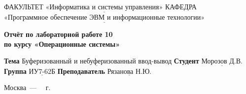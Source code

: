 \begin{titlepage}
	
	\noindent ФАКУЛЬТЕТ $\underline{\text{«Информатика и системы управления»}}$ \newline\newline
	\noindent КАФЕДРА $\underline{\text{«Программное обеспечение ЭВМ и информационные технологии»}}$\newline\newline\newline\newline\newline\newline\newline
	
	\vspace{\baselineskip}

	\begin{center}
		\Large\textbf{Отчёт по лабораторной работе 10} \\
		\Large\textbf{по курсу «Операционные системы»} \\
	\end{center}
	\vspace{2.5cm}
	
	\noindent\textbf{Тема} $\underline{\text{Буферизованный и небуферизованный ввод-вывод}}$\newline\newline
	\noindent\textbf{Студент} $\underline{\text{Морозов Д.В.}}$\newline\newline
	\noindent\textbf{Группа} $\underline{\text{ИУ7-62Б}}$\newline\newline
	\noindent\textbf{Преподаватель} $\underline{\text{Рязанова Н.Ю.}}$\newline
	
	\begin{center}
		\vfill
		Москва~---~\the\year
		~г.
	\end{center}
	\restoregeometry
\end{titlepage}